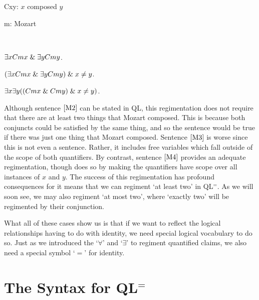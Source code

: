 \begin{multicols}{2}

\begin{ekey}
  \item[Cxy:] $x$ composed $y$
  \item[m:] Mozart
  \item[] ~
\end{ekey}

\begin{earg}
  \item[\ex{M2}] $\exists x Cmx \mathrel\& \exists y Cmy$.
  \item[\ex{M3}] $(\exists x Cmx \mathrel\& \exists y Cmy) \mathrel\& x\neq y$.
  \item[\ex{M4}] $\exists x\exists y((Cmx \mathrel\& Cmy) \mathrel\& x\neq y)$.
\end{earg}

\end{multicols}

Although sentence $\ref{M2}$ can be stated in QL, this regimentation does not require that there are at least two things that Mozart composed.
This is because both conjuncts could be satisfied by the same thing, and so the sentence would be true if there was just one thing that Mozart composed.
Sentence $\ref{M3}$ is worse since this is not even a sentence. 
Rather, it includes free variables which fall outside of the scope of both quantifiers.
By contrast, sentence $\ref{M4}$ provides an adequate regimentation, though does so by making the quantifiers have scope over all instances of $x$ and $y$. 
The success of this regimentation has profound consequences for it means that we can regiment `at least two' in QL$^=$.
As we will soon see, we may also regiment `at most two', where `exactly two' will be regimented by their conjunction.

What all of these cases show us is that if we want to reflect the logical relationships having to do with identity, we need special logical vocabulary to do so.
Just as we introduced the `$\forall$' and `$\exists$' to regiment quantified claims, we also need a special symbol `$=$' for identity.




\section{The Syntax for QL$^=$}
  \label{sec:SyntaxQL=}


